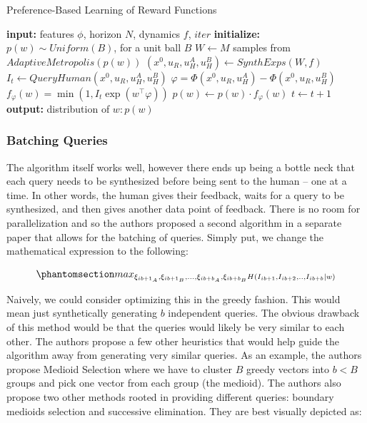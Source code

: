 \documentclass[
  letterpaper,
  numbers=noenddot,
  DIV=11]{scrreprt}
\theoremstyle{plain}
\theoremstyle{definition}
\theoremstyle{plain}
\theoremstyle{remark}
\begin{document}
\begin{algorithm}[H]
\caption{Preference-Based Learning of Reward Functions}
\label{alg-design}
\begin{algorithmic}[1]
    \State \textbf{input:} features $\phi$, horizon $N$, dynamics $f$, $iter$
    \State \textbf{initialize:} $p(w) \sim Uniform(B)$, for a unit ball $B$
        \State $W \gets M$ samples from $AdaptiveMetropolis(p(w))$
        \State $(x^0, u_R, u^A_H, u^B_H) \gets SynthExps(W,f)$
        \State $I_t \gets QueryHuman(x^0, u_R, u^A_H, u^B_H)$
        \State $\varphi = \Phi(x^0, u_R, u^A_H) - \Phi(x^0, u_R, u^B_H)$
        \State $f_\varphi(w) = \min(1, I_t\exp(w^\top \varphi))$
        \State $p(w) \gets p(w) \cdot f_\varphi(w)$
        \State $t \gets t+1$
    \EndWhile
    \State \textbf{output:} distribution of $w: p(w)$
\end{algorithmic}
\end{algorithm}

\subsubsection*{Batching Queries}\label{batching-queries}

The algorithm itself works well, however there ends up being a bottle
neck that each query needs to be synthesized before being sent to the
human -- one at a time. In other words, the human gives their feedback,
waits for a query to be synthesized, and then gives another data point
of feedback. There is no room for parallelization and so the authors
proposed a second algorithm in a separate paper that allows for the
batching of queries. Simply put, we change the mathematical expression
to the following:

\begin{equation}\phantomsection\label{eq-eq3.44}{max_{\xi_{ib+1_A}, \xi_{ib+1_B}, ... , \xi_{ib+b_A}, \xi_{ib+b_B} H(I_{ib+1}, I_{ib+2}, .., I_{ib+b} | w)}}\end{equation}

Naively, we could consider optimizing this in the greedy fashion. This
would mean just synthetically generating \(b\) independent queries. The
obvious drawback of this method would be that the queries would likely
be very similar to each other. The authors propose a few other
heuristics that would help guide the algorithm away from generating very
similar queries. As an example, the authors propose Medioid Selection
where we have to cluster \(B\) greedy vectors into \(b < B\) groups and
pick one vector from each group (the medioid). The authors also propose
two other methods rooted in providing different queries: boundary
medioids selection and successive elimination. They are best visually
depicted as:
\end{document}

